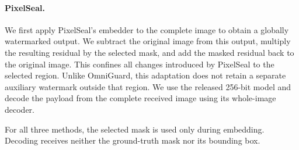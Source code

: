 \paragraph{PixelSeal.}
We first apply PixelSeal's embedder to the complete image to obtain a globally watermarked output.
We subtract the original image from this output, multiply the resulting residual by the selected mask, and add the masked residual back to the original image.
This confines all changes introduced by PixelSeal to the selected region.
Unlike OmniGuard, this adaptation does not retain a separate auxiliary watermark outside that region.
We use the released 256-bit model and decode the payload from the complete received image using its whole-image decoder.

For all three methods, the selected mask is used only during embedding.
Decoding receives neither the ground-truth mask nor its bounding box.

